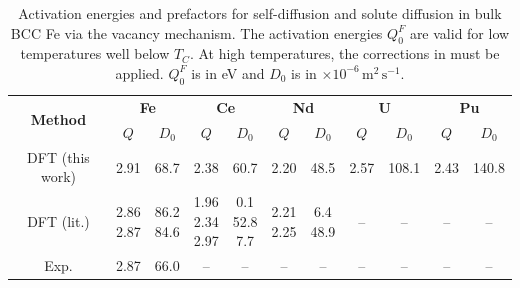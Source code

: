 \documentclass[preprint,12pt]{elsarticle}
\providecommand{\DIFaddbegin}{\protect\color{blue}} %
\providecommand{\DIFaddend}{\protect\color{black}} %
\providecommand{\DIFdelend}{\protect\color{black}} %
\newcommand{\DIFaddincludegraphics}[2][]{{\color{blue}\fbox{\DIFOincludegraphics[#1]{#2}}}} %
\DeclareRobustCommand{\DIFaddbegin}{\DIFOaddbegin \let\includegraphics\DIFaddincludegraphics} %
\DeclareRobustCommand{\DIFaddend}{\DIFOaddend \let\includegraphics\DIFOincludegraphics} %
\DeclareRobustCommand{\DIFdelend}{\DIFOaddend \let\includegraphics\DIFOincludegraphics} %
\begin{document}
\DIFdelend \DIFaddbegin \begin{table}[!ht]
    \centering
    \caption{Activation energies and prefactors for self-diffusion and solute diffusion in bulk BCC Fe via the vacancy mechanism. The activation energies $Q_0^F$ are valid for low temperatures well below $T_C$. At high temperatures, the corrections in  must be applied. $Q_0^F$ is in eV and $D_0$ is in $\times 10^{-6}\,\mathrm{m^2\,s^{-1}}$.}
    \label{tab:activation_energies}
    \footnotesize
    \setlength{\tabcolsep}{3pt}
    \renewcommand{\arraystretch}{1.15}
    \begin{tabular}{|c|cc|cc|cc|cc|cc|}
    \hline
    \multirow{2}{*}{\textbf{Method}} 
    & \multicolumn{2}{c|}{\textbf{Fe}} 
    & \multicolumn{2}{c|}{\textbf{Ce}} 
    & \multicolumn{2}{c|}{\textbf{Nd}} 
    & \multicolumn{2}{c|}{\textbf{U}} 
    & \multicolumn{2}{c|}{\textbf{Pu}} \\
    \cline{2-11}
    & $Q$ & $D_0$ 
    & $Q$ & $D_0$ 
    & $Q$ & $D_0$ 
    & $Q$ & $D_0$ 
    & $Q$ & $D_0$ \\
    \hline
    DFT (this work)
    & 2.91 & 68.7
    & 2.38 & 60.7
    & 2.20 & 48.5
    & 2.57 & 108.1
    & 2.43 & 140.8 \\
    \hline
    DFT (lit.)
    & \shortstack{2.86 \cite{ke2025diffusion} \\ 2.87 \cite{sandberg2015modeling}} 
    & \shortstack{86.2 \cite{ke2025diffusion} \\ 84.6 \cite{sandberg2015modeling}}
    & \shortstack{1.96 \cite{yang_significant_2023} \\ 2.34 \cite{ke2025diffusion} \\ 2.97 \cite{GAO2016316}}
    & \shortstack{0.1 \cite{yang_significant_2023} \\ 52.8 \cite{ke2025diffusion} \\ 7.7 \cite{GAO2016316}}
    & \shortstack{2.21 \cite{yang_significant_2023} \\ 2.25 \cite{ke2025diffusion}}
    & \shortstack{6.4 \cite{yang_significant_2023} \\ 48.9 \cite{ke2025diffusion}}
    & -- & --
    & -- & -- \\
    \hline
    Exp.
    & 2.87 \cite{lubbehusen1990self} 
    & 66.0 \cite{lubbehusen1990self}
    & -- & --
    & -- & --
    & -- & --
    & -- & -- \\
    \hline
    \end{tabular}
\end{table}
\DIFaddend 
\end{document}
